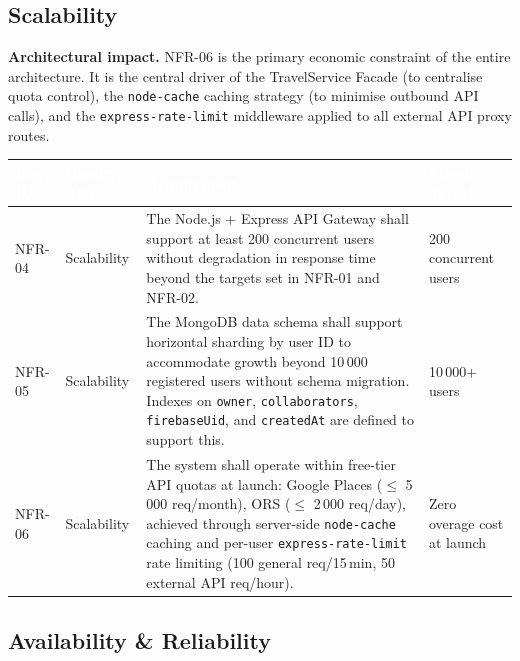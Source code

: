 \documentclass[12pt, a4paper]{article}
\newcommand{\reqid}[1]{\textsc{\small #1}}
\newcommand{\thcell}[1]{\textcolor{white}{\textbf{\small #1}}}
\begin{document}
\subsection{Scalability}

\begin{tcolorbox}[notebox]
  \textbf{Architectural impact.} NFR-06 is the primary economic constraint of the entire architecture. It is the central driver of the TravelService Facade (to centralise quota control), the \texttt{node-cache} caching strategy (to minimise outbound API calls), and the \texttt{express-rate-limit} middleware applied to all external API proxy routes.
\end{tcolorbox}

\vspace{0.4em}
\begin{longtable}{C{1.5cm} C{2.4cm} L{7.0cm} C{2.7cm}}
\toprule
{}
\thcell{Req ID} & \thcell{Quality Attr.} & \thcell{Requirement} & \thcell{Metric / Target} \\
\midrule
\endhead
\bottomrule
\endfoot

\reqid{NFR-04} & Scalability &
The Node.js + Express API Gateway shall support at least 200 concurrent users without degradation in response time beyond the targets set in NFR-01 and NFR-02. &
200 concurrent users \\

\reqid{NFR-05} & Scalability &
The MongoDB data schema shall support horizontal sharding by user ID to accommodate growth beyond 10\,000 registered users without schema migration. Indexes on \texttt{owner}, \texttt{collaborators}, \texttt{firebaseUid}, and \texttt{createdAt} are defined to support this. &
10\,000$+$ users \\

\reqid{NFR-06} & Scalability &
The system shall operate within free-tier API quotas at launch: Google Places ($\leq$ 5\,000 req/month), ORS ($\leq$ 2\,000 req/day), achieved through server-side \texttt{node-cache} caching and per-user \texttt{express-rate-limit} rate limiting (100 general req/15\,min, 50 external API req/hour). &
Zero overage cost at launch \\

\end{longtable}

\subsection{Availability \& Reliability}
\end{document}
